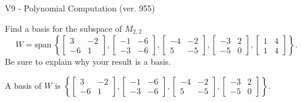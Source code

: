 \begin{exercise}
  \begin{exerciseTitle}V9 - Polynomial Computation (ver. 955)\end{exerciseTitle}
  \begin{exerciseStatement}
    Find a basis for the subspace of \(M_{2,2}\) 
\[W=\mathrm{span}\ \left\{\left[\begin{array}{cc}
3 & -2 \\
-6 & 1
\end{array}\right] , \left[\begin{array}{cc}
-1 & -6 \\
-3 & -6
\end{array}\right] , \left[\begin{array}{cc}
-4 & -2 \\
5 & -5
\end{array}\right] , \left[\begin{array}{cc}
-3 & 2 \\
-5 & 0
\end{array}\right] , \left[\begin{array}{cc}
1 & 4 \\
1 & 4
\end{array}\right]\right\}.\]
 Be sure to explain why your result is a basis.


  \end{exerciseStatement}
  \begin{exerciseAnswer}
   A basis of \(W\) is  \(\left\{\left[\begin{array}{cc}
3 & -2 \\
-6 & 1
\end{array}\right] , \left[\begin{array}{cc}
-1 & -6 \\
-3 & -6
\end{array}\right] , \left[\begin{array}{cc}
-4 & -2 \\
5 & -5
\end{array}\right] , \left[\begin{array}{cc}
-3 & 2 \\
-5 & 0
\end{array}\right]\right\}\).
  


  \end{exerciseAnswer}
\end{exercise}